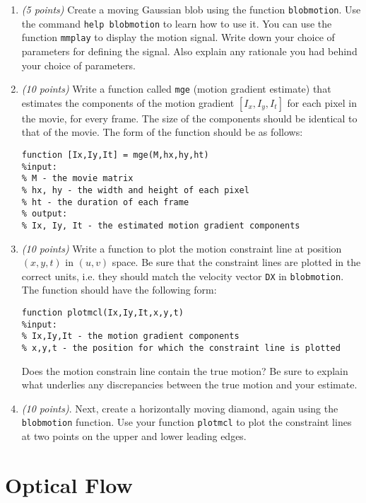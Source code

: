\documentclass[11pt]{article}
\begin{document}
\begin{enumerate}

\item \emph{(5 points)}  Create a moving Gaussian blob using the function \texttt{blobmotion}.  Use the command \texttt{help blobmotion} to learn how to use it.  You can use the function \texttt{mmplay} to display the motion signal.  Write down your choice of parameters for defining the signal.  Also explain any rationale you had behind your choice of parameters.

\item \emph{(10 points)} Write a function called \texttt{mge} (motion gradient estimate) that estimates the components of the motion gradient $[I_x, I_y, I_t]$ for each pixel in the movie, for every frame.  The size of the components should be identical to that of the movie.  The form of the function should be as follows:
\begin{verbatim}
function [Ix,Iy,It] = mge(M,hx,hy,ht)
%input:
% M - the movie matrix
% hx, hy - the width and height of each pixel
% ht - the duration of each frame
% output:
% Ix, Iy, It - the estimated motion gradient components
\end{verbatim}

\item \emph{(10 points)} Write a function to plot the motion constraint line at position $(x,y,t)$
in $(u,v)$ space.  Be sure that the constraint lines are plotted in the correct units, i.e. they should match the velocity vector \texttt{DX} in \texttt{blobmotion}.
The function should have the following form:
\begin{verbatim}
function plotmcl(Ix,Iy,It,x,y,t)
%input:
% Ix,Iy,It - the motion gradient components
% x,y,t - the position for which the constraint line is plotted
\end{verbatim}
Does the motion constrain line contain the true motion? Be sure to explain what underlies any discrepancies between the true motion and your estimate.

\item \emph{(10 points)}.  Next, create a horizontally moving diamond, again using the \texttt{blobmotion} function.  Use your function \texttt{plotmcl} to plot the constraint lines at two points on the upper and lower leading edges.

\end{enumerate}

\pagebreak
\section{Optical Flow}
\end{document}
